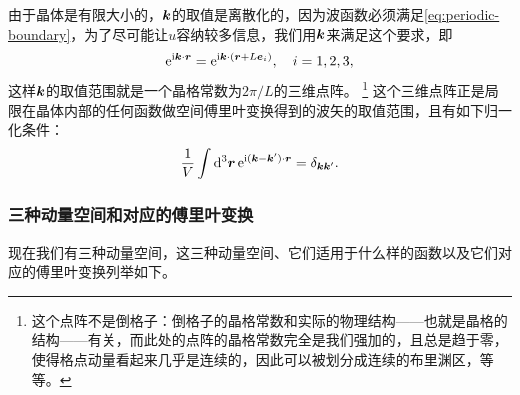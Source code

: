 \documentclass[hyperref, UTF8, a4paper]{ctexart}
\newcommand*{\ii}{\mathrm{i}}
\newcommand*{\ee}{\mathrm{e}}
\begin{document}
由于晶体是有限大小的，$\vb*{k}$的取值是离散化的，因为波函数必须满足\eqref{eq:periodic-boundary}，为了尽可能让$u$容纳较多信息，我们用$\vb*{k}$来满足这个要求，即
\[
    \ee^{\ii \vb*{k} \cdot \vb*{r}} = \ee^{\ii \vb*{k} \cdot (\vb*{r} + L \vb*{e}_i)}, \quad i = 1, 2, 3,
\]
这样$\vb*{k}$的取值范围就是一个晶格常数为$2\pi / L$的三维点阵。%
\footnote{这个点阵不是倒格子：倒格子的晶格常数和实际的物理结构——也就是晶格的结构——有关，而此处的点阵的晶格常数完全是我们强加的，且总是趋于零，使得格点动量看起来几乎是连续的，因此可以被划分成连续的布里渊区，等等。
}%
这个三维点阵正是局限在晶体内部的任何函数做空间傅里叶变换得到的波矢的取值范围，且有如下归一化条件：
\begin{equation}
    \frac{1}{V} \int \dd[3]{\vb*{r}} \ee^{\ii (\vb*{k} - \vb*{k}') \cdot \vb*{r}} = \delta_{\vb*{k}\vb*{k}'}.
\end{equation}

\subsubsection{三种动量空间和对应的傅里叶变换}

现在我们有三种动量空间，这三种动量空间、它们适用于什么样的函数以及它们对应的傅里叶变换列举如下。
\end{document}

